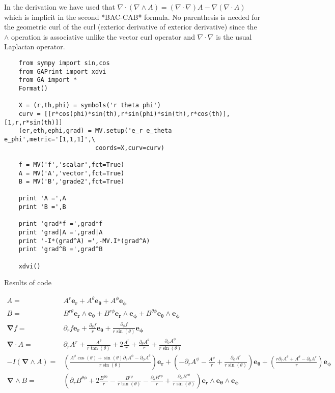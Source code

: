 \documentclass[10pt]{article}
\newcommand{\lp}{\left (}
\newcommand{\rp}{\right )}
\newcommand{\W}{\wedge}
\newcommand{\paren}[1]{\lp {#1} \rp}
\begin{document}
    In the derivation we have used that $\nabla\cdot\paren{\nabla\W A} = \paren{\nabla\cdot\nabla}A - \nabla\paren{\nabla\cdot A}$
    which is implicit in the second *BAC-CAB* formula.
    No parenthesis is needed for the geometric curl of the curl (exterior derivative of exterior derivative)
    since the $\W$ operation is associative unlike the vector curl operator and $\nabla\cdot\nabla$ is the usual Laplacian
    operator.

\begin{lstlisting}
    from sympy import sin,cos
    from GAPrint import xdvi
    from GA import *
    Format()

    X = (r,th,phi) = symbols('r theta phi')
    curv = [[r*cos(phi)*sin(th),r*sin(phi)*sin(th),r*cos(th)],[1,r,r*sin(th)]]
    (er,eth,ephi,grad) = MV.setup('e_r e_theta e_phi',metric='[1,1,1]',\
                         coords=X,curv=curv)

    f = MV('f','scalar',fct=True)
    A = MV('A','vector',fct=True)
    B = MV('B','grade2',fct=True)

    print 'A =',A
    print 'B =',B

    print 'grad*f =',grad*f
    print 'grad|A =',grad|A
    print '-I*(grad^A) =',-MV.I*(grad^A)
    print 'grad^B =',grad^B

    xdvi()
\end{lstlisting}

Results of code

    \begin{align*}
    A =& A^{r}\bm{e_{r}}+A^{\theta}\bm{e_{\theta}}+A^{\phi}\bm{e_{\phi}} \\
    B =& B^{r\theta}\bm{e_{r}\W e_{\theta}}+B^{r\phi}\bm{e_{r}\W e_{\phi}}+B^{\theta\phi}\bm{e_{\theta}\W e_{\phi}} \\
    \bm{\nabla}  f =& \partial_{r} f\bm{e_{r}}+\frac{\partial_{\theta} f}{r}\bm{e_{\theta}}+\frac{\partial_{\phi} f}{r \sin{\left (\theta \right )}}\bm{e_{\phi}} \\
    \bm{\nabla} \cdot A =& \partial_{r} A^{r} + \frac{A^{\theta}}{r \tan{\left (\theta \right )}} + 2 \frac{A^{r}}{r} + \frac{\partial_{\theta} A^{\theta}}{r} + \frac{\partial_{\phi} A^{\phi}}{r \sin{\left (\theta \right )}} \\
    -I (\bm{\nabla} \W A) =& \left ( \frac{A^{\phi} \cos{\left (\theta \right )} + \sin{\left (\theta \right )} \partial_{\theta} A^{\phi} - \partial_{\phi} A^{\theta}}{r \sin{\left (\theta \right )}}\right ) \bm{e_{r}}+\left ( - \partial_{r} A^{\phi} - \frac{A^{\phi}}{r} + \frac{\partial_{\phi} A^{r}}{r \sin{\left (\theta \right )}}\right ) \bm{e_{\theta}}+\left ( \frac{r \partial_{r} A^{\theta} + A^{\theta} - \partial_{\theta} A^{r}}{r}\right ) \bm{e_{\phi}} \\
    \bm{\nabla} \W B =& \left ( \partial_{r} B^{\theta\phi} + 2 \frac{B^{\theta\phi}}{r} - \frac{B^{r\phi}}{r \tan{\left (\theta \right )}} - \frac{\partial_{\theta} B^{r\phi}}{r} + \frac{\partial_{\phi} B^{r\theta}}{r \sin{\left (\theta \right )}}\right ) \bm{e_{r}\W e_{\theta}\W e_{\phi}}
    \end{align*}
\end{document}

